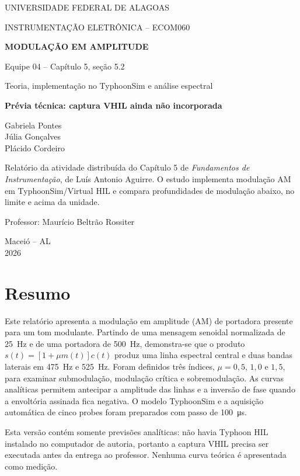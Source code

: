 \documentclass[11pt,a4paper]{article}
\newif\ifcapturavhil
\newcommand{\statuscaptura}{\ifcapturavhil Resultados experimentais VHIL incluídos\else Prévia técnica: captura VHIL ainda não incorporada\fi}
\begin{document}
\begin{titlepage}
\thispagestyle{empty}
\begin{center}
{\large UNIVERSIDADE FEDERAL DE ALAGOAS\par}
\vspace{0.15cm}
{\large INSTRUMENTAÇÃO ELETRÔNICA -- ECOM060\par}
\vfill
{\LARGE\bfseries MODULAÇÃO EM AMPLITUDE\par}
\vspace{0.2cm}
{\Large Equipe 04 -- Capítulo 5, seção 5.2\par}
\vspace{0.35cm}
{\large Teoria, implementação no TyphoonSim e análise espectral\par}
\vspace{0.8cm}
{\normalsize\color{\ifcapturavhil verde\else vermelho\fi}\bfseries\statuscaptura\par}
\vfill
Gabriela Pontes\\
Júlia Gonçalves\\
Plácido Cordeiro
\vfill
\begin{minipage}{0.76\textwidth}
\small
Relatório da atividade distribuída do Capítulo 5 de \emph{Fundamentos de Instrumentação}, de Luís Antonio Aguirre. O estudo implementa modulação AM em TyphoonSim/Virtual HIL e compara profundidades de modulação abaixo, no limite e acima da unidade.
\par\medskip
Professor: Maurício Beltrão Rossiter
\end{minipage}
\vfill
Maceió -- AL\\2026
\end{center}
\end{titlepage}

\section*{Resumo}
Este relatório apresenta a modulação em amplitude (AM) de portadora presente para um tom modulante. Partindo de uma mensagem senoidal normalizada de \SI{25}{\hertz} e de uma portadora de \SI{500}{\hertz}, demonstra-se que o produto $s(t)=[1+\mu m(t)]c(t)$ produz uma linha espectral central e duas bandas laterais em \SI{475}{\hertz} e \SI{525}{\hertz}. Foram definidos três índices, $\mu=0{,}5$, $1{,}0$ e $1{,}5$, para examinar submodulação, modulação crítica e sobremodulação. As curvas analíticas permitem antecipar a amplitude das linhas e a inversão de fase quando a envoltória assinada fica negativa. O modelo TyphoonSim e a aquisição automática de cinco probes foram preparados com passo de \SI{100}{\micro\second}.
\ifcapturavhil
 A seção experimental usa a captura VHIL anexada, com tabela, formas de onda, FFT e hashes de rastreabilidade.
\else
 Esta versão contém somente previsões analíticas: não havia Typhoon HIL instalado no computador de autoria, portanto a captura VHIL precisa ser executada antes da entrega ao professor. Nenhuma curva teórica é apresentada como medição.
\fi
\end{document}
